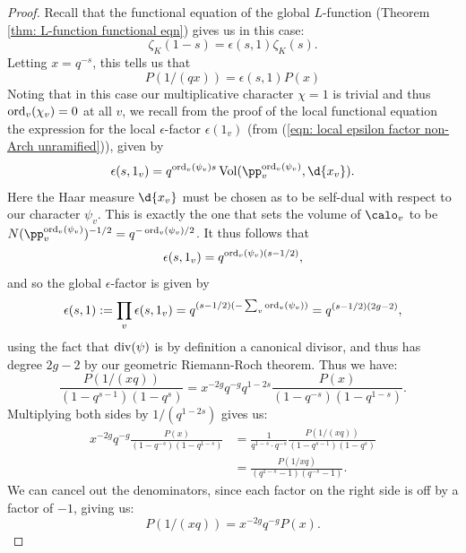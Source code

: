 \documentclass[11pt, x11names, openany]{book}
\begin{document}
\begin{proof}
Recall that the functional equation of the global $L$-function (Theorem \ref{thm: L-function functional eqn}) gives us in this case:
\begin{equation*}
    \zeta_K(1-s) = \epsilon(s, 1) \zeta_K(s).
\end{equation*}
Letting $x = q^{-s}$, this tells us that
\begin{equation*}
    P(1/(qx)) = \epsilon(s, 1) P(x) 
\end{equation*}
Noting that in this case our multiplicative character $\chi = 1$ is trivial and thus $\operatorname{ord}_v(\chi_v) = 0$ at all $v$, we recall from the proof of the local functional equation the expression for the local $\epsilon$-factor $\epsilon(1_v)$ (from (\ref{eqn: local epsilon factor non-Arch unramified})), given by
\begin{equation*}
    \epsilon(s, 1_v) = q^{\ord_v(\psi_v) s} \vol(\pp_v^{\ord_v(\psi_v)}, \d{x_v}).
\end{equation*}
Here the Haar measure $\d{x_v}$ must be chosen as to be self-dual with respect to our character $\psi_v$. This is exactly the one that sets the volume of $\calo_v$ to be $N(\pp_v^{\ord_v(\psi_v)})^{-1/2} = q^{- \ord_v(\psi_v)/2}$. It thus follows that
\begin{equation*}
    \epsilon(s, 1_v) = q^{\operatorname{ord}_v(\psi_v)(s - 1/2)},
\end{equation*}
and so the global $\epsilon$-factor is given by
\begin{equation*}
    \epsilon(s, 1) := \prod_v \epsilon(s, 1_v) = q^{(s-1/2)(-\sum_v \operatorname{ord}_v(\psi_v))} = q^{(s-1/2)(2g -2)},
\end{equation*}
using the fact that $\operatorname{div}(\psi)$ is by definition a canonical divisor, and thus has degree $2g-2$ by our geometric Riemann-Roch theorem. Thus we have:
\begin{equation*}
    \frac{P(1/(xq))}{(1 - q^{s-1})(1 - q^s)} = x^{-2g} q^{-g} q^{1 - 2s} \frac{P(x)}{(1 - q^{-s})(1 - q^{1-s})}. 
\end{equation*}
Multiplying both sides by $1/(q^{1-2s})$ gives us:
\begin{align*}
    x^{-2g} q^{-g} \frac{P(x)}{(1 - q^{-s})(1 - q^{1-s})} &= \frac{1}{q^{1-s} \cdot q^{-s}}\frac{P(1/(xq))}{(1 - q^{s-1})(1 - q^s)}\\
    &= \frac{P(1/xq)}{(q^{1-s} - 1)(q^{-s} - 1)}.
\end{align*}
We can cancel out the denominators, since each factor on the right side is off by a factor of $-1$, giving us:
\begin{equation}
    \label{eqn: fn field dedekind zeta function func eqn}
    P(1/(xq)) = x^{-2g} q^{-g} P(x).
\end{equation} 


\end{proof}
\end{document}
